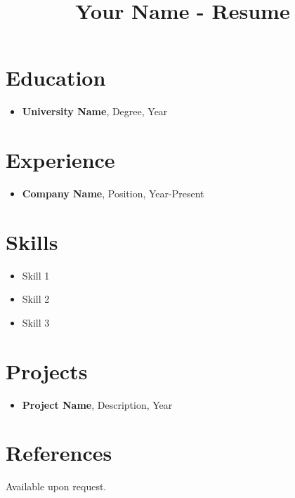 \documentclass{article}
\title{Your Name - Resume}
\author{}
\date{}
\begin{document}
\maketitle

\section*{Education}

\begin{itemize}[leftmargin=*]
    \item \textbf{University Name}, Degree, Year
\end{itemize}

\section*{Experience}

\begin{itemize}[leftmargin=*]
    \item \textbf{Company Name}, Position, Year-Present
\end{itemize}

\section*{Skills}

\begin{itemize}[leftmargin=*]
    \item Skill 1
    \item Skill 2
    \item Skill 3
\end{itemize}

\section*{Projects}

\begin{itemize}[leftmargin=*]
    \item \textbf{Project Name}, Description, Year
\end{itemize}

\section*{References}

Available upon request.
\end{document}
